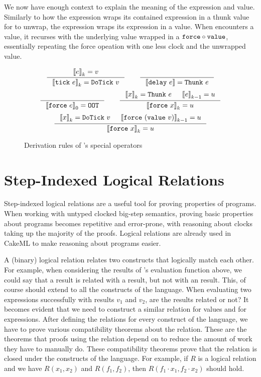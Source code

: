 We now have enough context to explain the meaning of the  expression
and  value. Similarly to how the  expression wraps its
contained expression in a thunk value for  to unwrap, the 
expression wraps its expression in a  value. When 
encounters a  value, it recurses with the underlying value wrapped
in a $\texttt{force} \circ \texttt{value}$, essentially repeating the force opeation
with one less clock and the unwrapped  value.

\begin{figure}[h]
  \[
    \inference
    {|[e|]_k = v}
    { |[\lit{tick}\ e|]_k = \lit{DoTick}\ v }\qquad
    \inference{}{|[\lit{delay}\ e|] = \lit{Thunk}\ e}
  \]
  \[
    \inference{}{|[\lit{force}\ e|]_0 = \lit{OOT}}\qquad
    \inference
    {|[x|]_k = \lit{Thunk}\ e& |[e|]_{k-1} = u}
    {|[\lit{force}\ x|]_k = u}
  \]
  \[
    \inference
    {|[x|]_k = \lit{DoTick}\ v
     & |[\lit{force}\ (\lit{value}\ v)|]_{k-1} = u}
    {|[\lit{force}\ x|]_k = u}
  \]
  \caption{Derivation rules of \ThunkLang{}'s special operators}
\end{figure}

\section{Step-Indexed Logical Relations}

Step-indexed logical relations \cite{dreyer2011logical} are a useful tool for
proving properties of programs. When working with untyped clocked big-step
semantics, proving basic properties about programs becomes repetitive and
error-prone, with reasoning about clocks taking up the majority of the proofs.
Logical relations are already used in CakeML to make reasoning about programs
easier.

A (binary) logical relation relates two constructs that logically match each
other. For example, when considering the results of \ThunkLang{}'s evaluation
function above, we could say that a  result is related with a
 result, but not with an  result. This, of course should
extend to all the constructs of the language. When evaluating two expressions
successfully with results $v_1$ and $v_2$, are the results related or not? It
becomes evident that we need to construct a similar relation for values and for
expressions. After defining the relations for every construct of the language,
we have to prove various compatibility theorems about the relation. These are
the theorems that proofs using the relation depend on to reduce the amount of
work they have to manually do. These compatibility theorems prove that the
relation is closed under the constructs of the language. For example, if $R$ is
a logical relation and we have $R(x_1, x_2)$ and $R(f_1, f_2)$, then $R(f_1
\cdot x_1, f_2 \cdot x_2)$ should hold.

